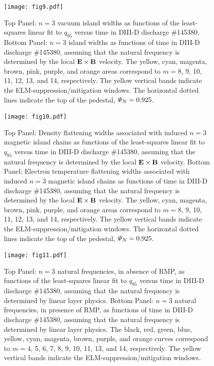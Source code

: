 \documentclass[12pt,prb,aps]{revtex4-1}
\begin{document}
\begin{figure}
\texttt{[image: fig9.pdf]}
\caption{Top Panel: $n=3$ vacuum island widths as functions of the least-squares linear fit to $q_{95}$ versus time
in   DIII-D discharge \#145380.
Bottom Panel:  $n=3$ island widths as functions of time
in   DIII-D discharge \#145380, assuming that the natural frequency is  determined by the local ${\bf E}\times {\bf B}$
velocity. The yellow, cyan, magenta, brown, pink,
purple, and orange  areas correspond to $m=8$, 9, 10, 11, 12, 13, and 14, respectively. The yellow vertical bands indicate the ELM-suppression/mitigation windows. 
The horizontal dotted lines indicate the top of the pedestal, ${\mit\Psi}_N=0.925$.} \label{fig9}
\end{figure}

\begin{figure}
\texttt{[image: fig10.pdf]}
\caption{Top Panel: Density flattening widths associated with induced $n=3$ magnetic island  chains as functions of the least-squares linear fit to $q_{95}$ versus time
in   DIII-D discharge \#145380, assuming that the natural frequency is  determined by the local ${\bf E}\times {\bf B}$
velocity.
Bottom Panel:  Electron temperature flattening widths associated with induced $n=3$ magnetic island chains as functions of time
in   DIII-D discharge \#145380, assuming that the natural frequency is determined by the local ${\bf E}\times {\bf B}$
velocity. The yellow, cyan, magenta, brown, pink,
purple, and orange  areas correspond to $m=8$, 9, 10, 11, 12, 13, and 14, respectively. The yellow vertical bands indicate the ELM-suppression/mitigation windows. 
The horizontal dotted lines indicate the top of the pedestal, ${\mit\Psi}_N=0.925$.} \label{fig10}
\end{figure}

\begin{figure}
\texttt{[image: fig11.pdf]}
\caption{Top Panel: $n=3$ natural frequencies, in absence of RMP, as functions of the least-squares linear fit to $q_{95}$ versus time
in   DIII-D discharge \#145380, assuming that the natural frequency is determined by linear layer physics.
Bottom Panel:  $n=3$ natural frequencies, in presence of RMP, as functions of time
in   DIII-D discharge \#145380, assuming that the natural frequency is determined by linear layer physics. The black, red, green, blue, yellow, cyan, magenta,  brown, 
purple, and orange curves correspond to $m=4$, 5, 6, 7, 8, 9, 10,  11, 13, and 14, respectively. The yellow vertical bands indicate the ELM-suppression/mitigation windows.} \label{fig11}
\end{figure}
\end{document}
